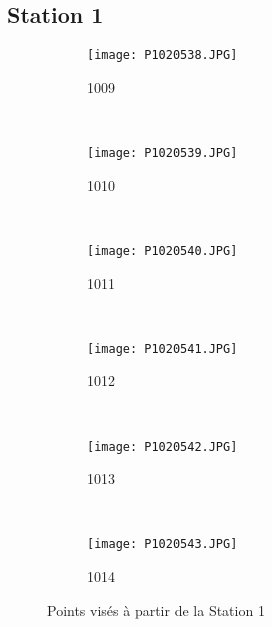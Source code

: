\subsection{Station 1}
\begin{figure}[!h]
    \centering
    \begin{subfigure}[b]{0.3\textwidth}
        \texttt{[image: P1020538.JPG]}
        \caption{1009}%
        \label{P1020538}
    \end{subfigure}
    ~
    \begin{subfigure}[b]{0.3\textwidth}
        \texttt{[image: P1020539.JPG]}
        \caption{1010}%
        \label{P1020539}
    \end{subfigure}
    ~
    \begin{subfigure}[b]{0.3\textwidth}
        \texttt{[image: P1020540.JPG]}
        \caption{1011}%
        \label{P1020540}
    \end{subfigure}
    \\
    \begin{subfigure}[b]{0.3\textwidth}
        \texttt{[image: P1020541.JPG]}
        \caption{1012}%
        \label{P1020541}
    \end{subfigure}
    ~
    \begin{subfigure}[b]{0.3\textwidth}
        \texttt{[image: P1020542.JPG]}
        \caption{1013}%
        \label{P1020542}
    \end{subfigure}
    ~
    \begin{subfigure}[b]{0.3\textwidth}
        \texttt{[image: P1020543.JPG]}
        \caption{1014}%
        \label{P1020543}
    \end{subfigure}
    \caption{Points visés à partir de la Station 1}
    \label{Points Cibles S1a}
\end{figure}

